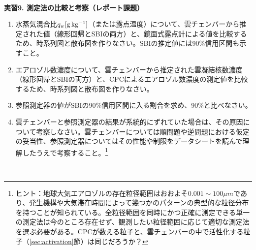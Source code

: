 \documentclass{ltjsarticle}
\begin{document}
\\
\begin{itembox}[l]{\bf{実習9. 測定法の比較と考察（レポート課題）}}
\begin{enumerate}
\item 水蒸気混合比$q_{w} \rm [g\,kg^{-1}]$（または露点温度）について、雲チェンバーから推定された値（線形回帰とSBIの両方）と、鏡面式露点計による値を比較するため、時系列図と散布図を作りなさい。SBIの推定値には90\%信用区間も示すこと。
\item エアロゾル数濃度について、雲チェンバーから推定された雲凝結核数濃度（線形回帰とSBIの両方）と、CPCによるエアロゾル数濃度の測定値を比較するため、時系列図と散布図を作りなさい。
\item 参照測定器の値がSBIの90\%信用区間に入る割合を求め、90\%と比べなさい。
\item 雲チェンバーと参照測定器の結果が系統的にずれていた場合は、その原因について考察しなさい。雲チェンバーについては順問題や逆問題における仮定の妥当性、参照測定器についてはその性能や制限をデータシートを読んで理解したうえで考察すること。\footnote{ヒント：地球大気エアロゾルの存在粒径範囲はおおよそ$0.001 \sim 100 \mu m$であり、発生機構や大気滞在時間によって幾つかのパターンの典型的な粒径分布を持つことが知られている。全粒径範囲を同時にかつ正確に測定できる単一の測定法は今のところ存在せず、観測したい粒径範囲に応じて適切な測定法を選ぶ必要がある。CPCが数える粒子と、雲チェンバーの中で活性化する粒子（\ref{sec:activation}節）は同じだろうか？}
\end{enumerate}
\end{itembox}
\\

\clearpage

\appendix
\end{document}
